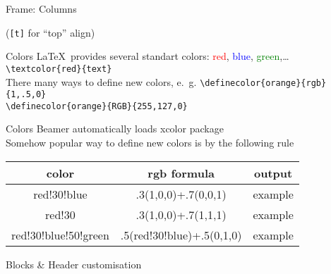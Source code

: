 \begin{frame}[fragile]{Frame: Columns}\relax
    \cprotect{}
    
    (\texttt{[t]} for ``top'' align)
\end{frame}


\begin{frame}[fragile]{Colors\preMagicPage}
    \LaTeX\ provides several standart colors: 
    \textcolor{red}{red}, \textcolor{blue}{blue}, \textcolor{green}{green},\dots\\
    \lstinline[basicstyle=\tt]|\textcolor{red}{text}| \\
    \pause
    There many ways to define new colors, e.~g.
    \lstinline[basicstyle=\tt]|\definecolor{orange}{rgb}{1,.5,0}|\\
    \lstinline[basicstyle=\tt]|\definecolor{orange}{RGB}{255,127,0}|
\end{frame}

\begin{frame}{Colors\magicPage}
    Beamer automatically loads \alert{xcolor} package\\
    Somehow popular way to define new colors is by the following rule
    \begin{table}
    \begin{tabular}{ccc}\hline
        color           &   rgb formula             &     output  \\\hline
        red!30!blue     &   .3(1,0,0)+.7(0,0,1)     &   \textcolor{red!30!blue}{example} \\
        red!30          &   .3(1,0,0)+.7(1,1,1)     &   \textcolor{red!30!}{example}    \\ 
        red!30!blue!50!green    &   .5(red!30!blue)+.5(0,1,0)   &   \textcolor{red!30!blue!50!green}{example}   
    \end{tabular}          
    \end{table}
\end{frame}

\begin{frame}[fragile]{Blocks \& Header customisation\magicPage}
        
    \cprotect{}
        
\end{frame}


